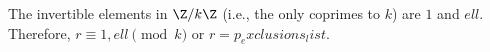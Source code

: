 The invertible elements in $\Z/{k}\Z$ (i.e., the only coprimes to ${k}$) are $1$ and ${ell}$. Therefore, $r\equiv 1,{ell}\pmod{{k}}$ or $r={p_exclusions_list}$.